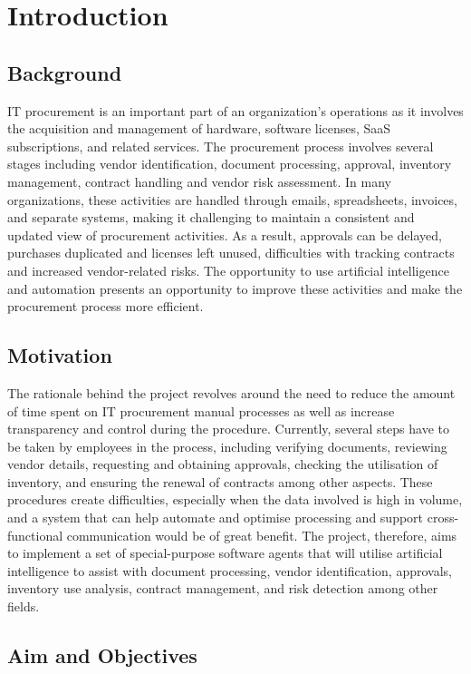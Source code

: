 
\chapter[Introduction]{\centering Introduction}\label{chap1}
\newpage

\section{Background}
IT procurement is an important part of an organization’s operations as it involves the acquisition and management of hardware, software licenses, SaaS subscriptions, and related services. The procurement process involves several stages including vendor identification, document processing, approval, inventory management, contract handling and vendor risk assessment. In many organizations, these activities are handled through emails, spreadsheets, invoices, and separate systems, making it challenging to maintain a consistent and updated view of procurement activities. As a result, approvals can be delayed, purchases duplicated and licenses left unused, difficulties with tracking contracts and increased vendor-related risks. The opportunity to use artificial intelligence and automation presents an opportunity to improve these activities and make the procurement process more efficient.


\section{Motivation}
The rationale behind the project revolves around the need to reduce the amount of time spent on IT procurement manual processes as well as increase transparency and control during the procedure. Currently, several steps have to be taken by employees in the process, including verifying documents, reviewing vendor details, requesting and obtaining approvals, checking the utilisation of inventory, and ensuring the renewal of contracts among other aspects. These procedures create difficulties, especially when the data involved is high in volume, and a system that can help automate and optimise processing and support cross-functional communication would be of great benefit. The project, therefore, aims to implement a set of special-purpose software agents that will utilise artificial intelligence to assist with document processing, vendor identification, approvals, inventory use analysis, contract management, and risk detection among other fields.
\section{Aim and Objectives}

